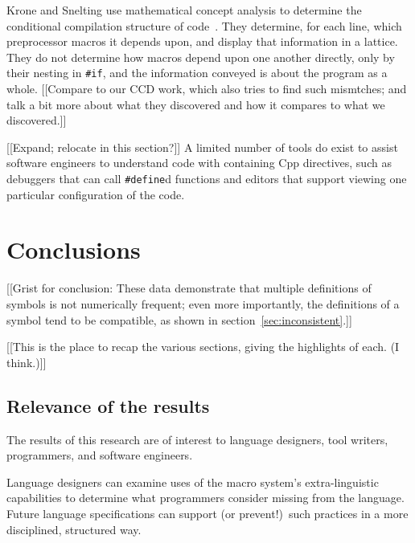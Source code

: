 \documentclass[10pt]{article}
\begin{document}

Krone and Snelting use mathematical concept analysis to determine the
conditional compilation structure of code~\cite{Krone94}.  They determine,
for each line, which preprocessor macros it depends upon, and display that
information in a lattice.  They do not determine how macros depend upon one
another directly, only by their nesting in {\tt \#if}, and the information
conveyed is about the program as a whole.  [[Compare to our CCD work, which
also tries to find such mismtches; and talk a bit more about what they
discovered and how it compares to what we discovered.]]


[[Expand; relocate in this section?]]
A limited number of tools do exist to assist software engineers to
understand code with containing Cpp directives, such as debuggers that can
call {\tt \#define}d functions and editors that support viewing one
particular configuration of the code.




\section{Conclusions}
\label{sec:conclusion}

[[Grist for conclusion: These data demonstrate that multiple definitions of
symbols is not numerically frequent; even more importantly, the definitions
of a symbol tend to be compatible, as shown in
section~\ref{sec:inconsistent}.]]


[[This is the place to recap the various sections, giving the highlights of
each.  (I think.)]]

\subsection{Relevance of the results}

The results of this research are of interest to language designers, tool
writers, programmers, and software engineers.

Language designers can examine uses of the macro system's extra-linguistic
capabilities to determine what programmers consider missing from the
language.  Future language specifications can support (or prevent!)\ such
practices in a more disciplined, structured way.
\end{document}
